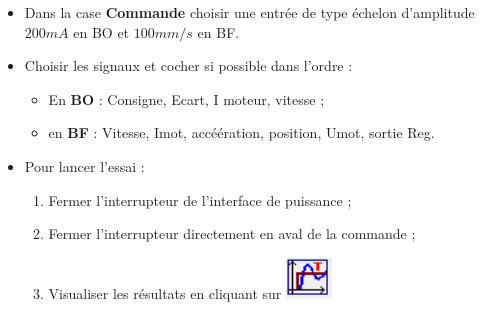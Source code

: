 \begin{itemize}
\begin{itemize}
\item Dans la case \textbf{Commande} choisir une entrée de type échelon d'amplitude $200mA$ en BO et $100mm/s$ en BF.
\item Choisir les signaux et cocher si possible dans l'ordre : 
\begin{itemize}
\item En \textbf{BO} : Consigne, Ecart, I moteur, vitesse ; 
\item en \textbf{BF} : Vitesse, Imot, accéération, position, Umot, sortie Reg.
\end{itemize}
\item Pour lancer l'essai : 
\begin{enumerate}
\item Fermer l'interrupteur de l'interface de puissance ; 
\item Fermer l'interrupteur directement en aval de la commande ; 
\item Visualiser les résultats en cliquant sur \includegraphics[width=0.1\textwidth]{images/icone.png}
\end{enumerate}
\end{itemize}

\end{itemize}